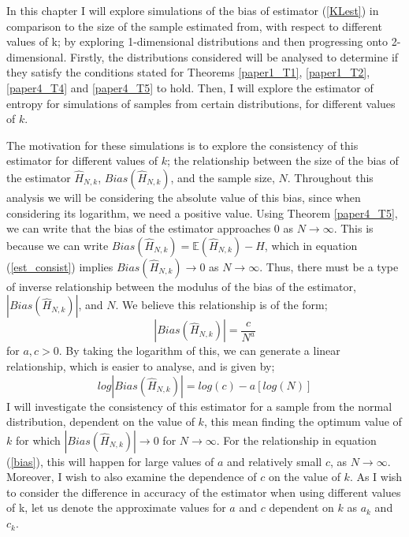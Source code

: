 \documentclass{report}
\begin{document}
In this chapter I will explore simulations of the bias of estimator (\ref{KLest}) in comparison to the size of the sample estimated from, with respect to different values of k; by exploring 1-dimensional distributions and then progressing onto 2-dimensional. Firstly, the distributions considered will be analysed to determine if they satisfy the conditions stated for Theorems \ref{paper1_T1}, \ref{paper1_T2}, \ref{paper4_T4} and \ref{paper4_T5} to hold. Then, I will explore the estimator of entropy for simulations of samples  from certain distributions, for different values of $k$.

The motivation for these simulations is to explore the consistency of this estimator for different values of $k$; the relationship between the size of the bias of the estimator $\hat{H}_{N, k}$, $Bias(\hat{H}_{N, k})$,  and the sample size, $N$. Throughout this analysis we will be considering the absolute value of this bias, since when considering its logarithm, we need a positive value. Using Theorem \ref{paper4_T5}, we can write that the bias of the estimator approaches 0 as $N \to \infty$. This is because we can write $Bias(\hat{H}_{N, k} ) = \mathbb{E}(\hat{H}_{N, k}) - H$, which in equation (\ref{est_consist}) implies $Bias(\hat{H}_{N, k}) \to 0$ as $N \to \infty$. Thus, there must be a type of inverse relationship between the modulus of the bias of the estimator, $|Bias(\hat{H}_{N, k})|$, and $N$. We believe this relationship is of the form;
\begin{equation} \label{bias}
|Bias(\hat{H}_{N, k})| = \frac{c}{N^a}
\end{equation}
for $a, c > 0$. By taking the logarithm of this, we can generate a linear relationship, which is easier to analyse, and is given by;
\begin{equation} \label{logbias}
log|Bias(\hat{H}_{N, k})| = log(c) - a [log(N)]
\end{equation}
I will investigate the consistency of this estimator for a sample from the normal distribution, dependent on the value of $k$, this mean finding the optimum value of $k$ for which $|Bias(\hat{H}_{N, k})| \to 0$ for $N \to \infty$. For the relationship in equation (\ref{bias}), this will happen for large values of $a$ and relatively small $c$, as $N \to \infty$. Moreover, I wish to also examine the dependence of $c$ on the value of $k$. As I wish to consider the difference in accuracy of the estimator when using different values of k, let us denote the approximate values for $a$ and $c$ dependent on $k$ as $a_{k}$ and $c_{k}$.
\end{document}
